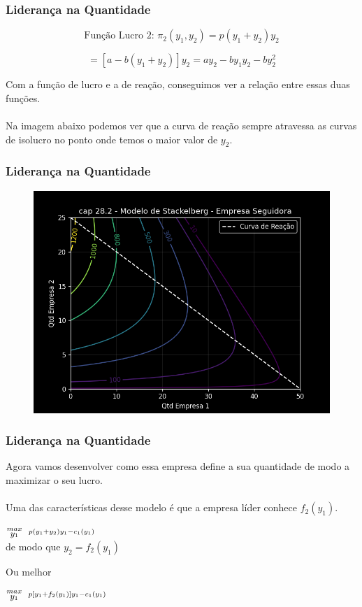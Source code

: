 \documentclass{beamer}[10]
\begin{document}
\begin{frame}
	\frametitle{Liderança na Quantidade}

	$$\textrm{Função Lucro 2: } \pi_2(y_1,y_2) = p(y_1 + y_2)y_2$$
	
	$$ = [a - b(y_1 + y_2)]y_2 = ay_2 - by_1 y_2 - by_2^2 $$

	Com a função de lucro e a de reação, conseguimos ver a relação entre essas duas funções. 
	\\~\\
	Na imagem abaixo podemos ver que a curva de reação sempre atravessa as curvas de isolucro no ponto onde temos o maior valor de $y_2$.

\end{frame}

\begin{frame}
	\frametitle{Liderança na Quantidade}

	\begin{figure}[H]
		\centering
		\includegraphics[scale=0.55]{cap28_2-modelo_stackelberg_parcial.png}
	\end{figure}
	
\end{frame}

\begin{frame}
	\frametitle{Liderança na Quantidade}

	Agora vamos desenvolver como essa empresa define a sua quantidade de modo a maximizar o seu lucro.
	\\~\\
	Uma das características desse modelo é que a empresa líder conhece $f_2(y_1)$.

	\begin{center}
		\LARGE $\stackrel{max}{\text{\small $y_1$}} \ \ \stackrel{p(y_1 + y_2)y_1 - c_1(y_1)}{\ }$ \\
		\small de modo que \normalsize $y_2 = f_2(y_1)$
	\end{center}

	Ou melhor

	\begin{center}
		\LARGE $\stackrel{max}{\text{\small $y_1$}} \ \ \stackrel{p[y_1 + f_2(y_1)]y_1 - c_1(y_1)}{\ }$ \\
	\end{center}
		
\end{frame}
\end{document}
